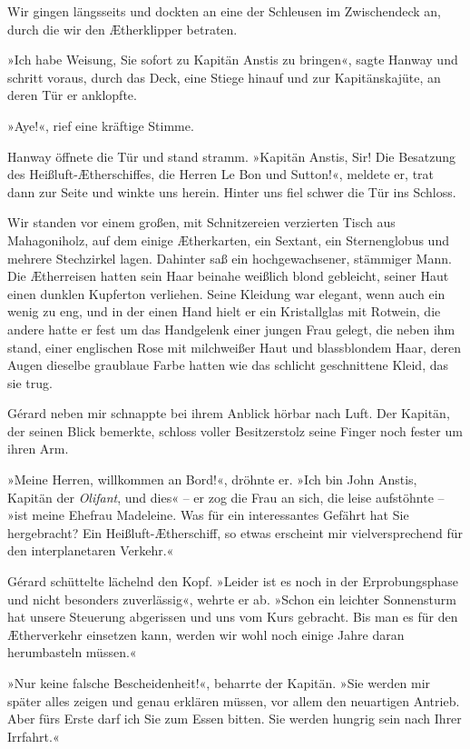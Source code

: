 Wir gingen längsseits und dockten an eine der Schleusen im
Zwischendeck an, durch die wir den Ætherklipper betraten.

»Ich habe Weisung, Sie sofort zu Kapitän Anstis zu bringen«, sagte
Hanway und schritt voraus, durch das Deck, eine Stiege hinauf und
zur Kapitänskajüte, an deren Tür er anklopfte.

»Aye!«, rief eine kräftige Stimme.

Hanway öffnete die Tür und stand stramm. »Kapitän Anstis, Sir! Die
Besatzung des Heißluft-Ætherschiffes, die Herren Le Bon und
Sutton!«, meldete er, trat dann zur Seite und winkte uns herein.
Hinter uns fiel schwer die Tür ins Schloss.

\bigpar

Wir standen vor einem großen, mit Schnitzereien verzierten Tisch
aus Mahagoniholz, auf dem einige Ætherkarten, ein Sextant, ein
Sternenglobus und mehrere Stechzirkel lagen. Dahinter saß ein
hochgewachsener, stämmiger Mann. Die Ætherreisen hatten sein Haar
beinahe weißlich blond gebleicht, seiner Haut einen dunklen
Kupferton verliehen. Seine Kleidung war elegant, wenn auch ein
wenig zu eng, und in der einen Hand hielt er ein Kristallglas mit
Rotwein, die andere hatte er fest um das Handgelenk einer jungen
Frau gelegt, die neben ihm stand, einer englischen Rose mit
milchweißer Haut und blassblondem Haar, deren Augen dieselbe
graublaue Farbe hatten wie das schlicht geschnittene Kleid, das sie
trug.

Gérard neben mir schnappte bei ihrem Anblick hörbar nach Luft. Der
Kapitän, der seinen Blick bemerkte, schloss voller Besitzerstolz
seine Finger noch fester um ihren Arm.

»Meine Herren, willkommen an Bord!«, dröhnte er. »Ich bin John
Anstis, Kapitän der \emph{Olifant}, und dies« – er zog die Frau an
sich, die leise aufstöhnte – »ist meine Ehefrau Madeleine. Was für
ein interessantes Gefährt hat Sie hergebracht? Ein
Heißluft-Ætherschiff, so etwas erscheint mir vielversprechend für
den interplanetaren Verkehr.«

Gérard schüttelte lächelnd den Kopf. »Leider ist es noch in der
Erprobungsphase und nicht besonders zuverlässig«, wehrte er ab.
»Schon ein leichter Sonnensturm hat unsere Steuerung abgerissen und
uns vom Kurs gebracht. Bis man es für den Ætherverkehr einsetzen
kann, werden wir wohl noch einige Jahre daran herumbasteln
müssen.«

»Nur keine falsche Bescheidenheit!«, beharrte der Kapitän. »Sie
werden mir später alles zeigen und genau erklären müssen, vor allem
den neuartigen Antrieb. Aber fürs Erste darf ich Sie zum Essen
bitten. Sie werden hungrig sein nach Ihrer Irrfahrt.«


